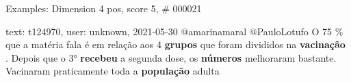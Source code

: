 \begin{frame}{Examples: Dimension 4 pos, score 5, \# 000021}
\footnotesize
\begin{exampleblock}{text: t124970, user: unknown, 2021-05-30}
@amarinamaral @PauloLotufo O 75 \% que a matéria fala é em relação aos 4 
\textbf{grupos} que foram divididos na \textbf{vacinação} . Depois que o 3° 
\textbf{recebeu} a segunda dose, os \textbf{números} melhoraram bastante. 
Vacinaram praticamente toda a \textbf{população} adulta 
\end{exampleblock}
\end{frame}

